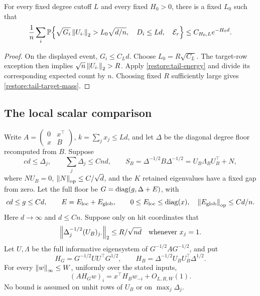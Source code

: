 \begin{corollary}
\label{restore:tail-target-corollary}
For every fixed degree cutoff $L$ and every fixed $H_0>0$, there is
a fixed $L_0$ such that
\begin{equation}
 \frac1n\sum_i\mathbb P\!\left\{
    \sqrt{G_i}\left\lVert U_{i\cdot}\right\rVert_2>L_0\sqrt{d/n},\quad
    D_i\le Ld,\quad \mathcal E_r\right\}
 \le C_{H_0,L}e^{-H_0d}.
 \label{restore:tail-target-mass}
\end{equation}
\end{corollary}

\begin{proof}
On the displayed event, $G_i\le C_Ld$.
Choose $L_0=R\sqrt{C_L}$.
The target-row exception then implies
$\sqrt n\left\lVert U_{i\cdot}\right\rVert_2>R$.
Apply \eqref{restore:tail-energy} and divide its corresponding
expected count by $n$.  Choosing fixed $R$ sufficiently large gives
\eqref{restore:tail-target-mass}.
\end{proof}

\subsection{The local scalar comparison}\label{restore:loo}
\begin{lemma}\label{restore:loo-scalar}
Write $A=\left(\begin{smallmatrix}0&x^\top\\x&B\end{smallmatrix}\right)$,
$k=\sum_jx_j\le Ld$, and let $\Delta$ be the diagonal degree floor
recomputed from $B$. Suppose
\[
 cd\le\Delta_j,\qquad \sum_j\Delta_j\le Cnd,
 \qquad S_B=\Delta^{-1/2}B\Delta^{-1/2}
   =U_B\Lambda_BU_B^\top+N,
\]
where $NU_B=0$, $\left\lVert N\right\rVert_{\mathrm{op}}\le C/\sqrt d$, and the $K$ retained
eigenvalues have a fixed gap from zero. Let the full floor be
$G=\operatorname{diag}(g,\Delta+E)$, with
\[
 cd\le g\le Cd,\qquad E=E_\mathrm{loc}+E_\mathrm{glob},\qquad
 0\le E_\mathrm{loc}\le\operatorname{diag}(x),\quad
 \left\lVert E_\mathrm{glob}\right\rVert_{\mathrm{op}}\le Cd/n.
\]
Here $d\to\infty$ and $d\le Cn$. Suppose only on hit coordinates that
\begin{equation}\label{restore:loo-hit}
 \left\lVert\Delta_j^{-1/2}(U_B)_{j\cdot}\right\rVert_2
       \le R/\sqrt{nd}\quad\text{whenever }x_j=1.
\end{equation}
Let $U,\Lambda$ be the full informative eigensystem of
$G^{-1/2}AG^{-1/2}$, and put
\[
 H_G=G^{-1/2}UU^\top G^{1/2},\qquad
 H_B=\Delta^{-1/2}U_BU_B^\top\Delta^{1/2}.
\]
For every $\left\lVert w\right\rVert_\infty\le W$, uniformly over the stated inputs,
\begin{equation}\label{restore:loo-main}
 (AH_Gw)_i=x^\top H_Bw_{-i}+O_{L,R,W}(1).
\end{equation}
No bound is assumed on unhit rows of $U_B$ or on $\max_j\Delta_j$.
\end{lemma}


